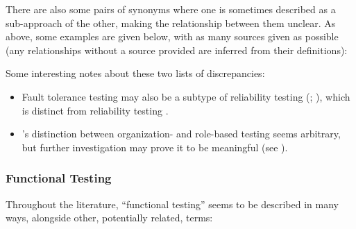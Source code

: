 There are also some pairs of synonyms where one is sometimes described as a
sub-approach of the other, making the relationship between them unclear. As
above, some examples are given below, with as many sources given as possible
(any relationships without a source provided are inferred from their
definitions):



Some interesting notes about these two lists of discrepancies:

\begin{itemize}
      \item Fault tolerance testing may also be a
            subtype of reliability testing
            (\citealp[p.~375]{IEEE2017}; \citealp[p.~7-10]{SWEBOK2024}), which
            is distinct from reliability testing \citep[p.~53]{Firesmith2015}.
      \item \citeauthor{Firesmith2015}'s distinction between organization-
            and role-based testing \citeyearpar[pp.~17,~37,~39]{Firesmith2015}
            seems arbitrary, but further investigation may prove it to be
            meaningful (see ).
\end{itemize}

\subsubsection{Functional Testing}

Throughout the literature, ``functional testing'' seems to be described in many
ways, alongside other, potentially related, terms:

